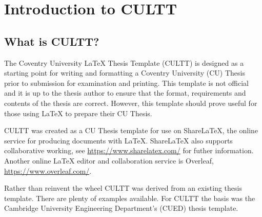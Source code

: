
\chapter{Introduction to CULTT}  %

\ifpdf
    \graphicspath{{Chapter1/Figs/Raster/}{Chapter1/Figs/PDF/}{Chapter1/Figs/}}
\else
    \graphicspath{{Chapter1/Figs/Vector/}{Chapter1/Figs/}}
\fi

\section{What is CULTT?} %

The Coventry University \LaTeX{} Thesis Template (CULTT) is designed as a starting point for writing and formatting a Coventry University (CU) Thesis prior to submission for examination and printing. This template is not official and it is up to the thesis author to ensure that the format, requirements and contents of the thesis are correct. However, this template should prove useful for those using \LaTeX{} to prepare their CU Thesis.

CULTT was created as a CU Thesis template for use on ShareLaTeX, the online service for producing documents with \LaTeX{}. ShareLaTeX also supports collaborative working, see \url{https://www.sharelatex.com/} for futher information. Another online \LaTeX{} editor and collaboration service is Overleaf, \url{https://www.overleaf.com/}.

Rather than reinvent the wheel CULTT was derived from an existing thesis template. There are plenty of examples available. For CULTT the basis was the Cambridge University Engineering Department's (CUED) thesis template.


